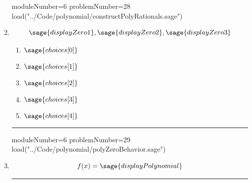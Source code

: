 \documentclass[14pt]{article}
\newcommand{\litem}[1]{\item#1\hspace*{-1cm}\rule{\textwidth}{0.4pt}}
\begin{document}
\begin{enumerate}
\begin{sagesilent}
moduleNumber=6
problemNumber=28
load("../Code/polynomial/constructPolyRationals.sage")
\end{sagesilent}

\litem{ 

	\[ \sage{displayZero1}, \sage{displayZero2}, \sage{displayZero3} \]

	\begin{enumerate}[label=\Alph*.]
		\item \( \sage{choices[0]} \)
		\item \( \sage{choices[1]} \)
		\item \( \sage{choices[2]} \)
		\item \( \sage{choices[3]} \)
		\item \( \sage{choices[4]} \)
	\end{enumerate}
}

\begin{sagesilent}
moduleNumber=6
problemNumber=29
load("../Code/polynomial/polyZeroBehavior.sage")
\end{sagesilent}

\litem{ 

	\[ f(x) = \sage{displayPolynomial} \]

}
\end{enumerate}
\end{document}
